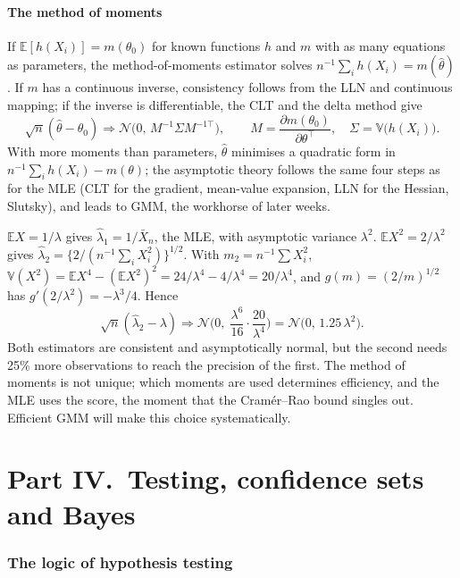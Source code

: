 \documentclass[11pt,a4paper]{article}
\newcommand{\E}{\mathbb{E}}
\newcommand{\V}{\mathbb{V}}
\newcommand{\N}{\mathcal{N}}
\newcommand{\cd}{\Rightarrow}
\newcommand{\Xbar}{\bar X_n}
\begin{document}
\subsection{The method of moments}

If $\E[h(X_i)]=m(\theta_0)$ for known functions $h$ and $m$ with as many equations as parameters, the method-of-moments estimator solves $n^{-1}\sum_ih(X_i)=m(\hat\theta)$. If $m$ has a continuous inverse, consistency follows from the LLN and continuous mapping; if the inverse is differentiable, the CLT and the delta method give
\[
\sqrt n(\hat\theta-\theta_0)\cd\N\big(0,\,M^{-1}\Sigma M^{-1\top}\big),\qquad M=\frac{\partial m(\theta_0)}{\partial\theta^\top},\quad\Sigma=\V\big(h(X_i)\big).
\]
With more moments than parameters, $\hat\theta$ minimises a quadratic form in $n^{-1}\sum_ih(X_i)-m(\theta)$; the asymptotic theory follows the same four steps as for the MLE (CLT for the gradient, mean-value expansion, LLN for the Hessian, Slutsky), and leads to GMM, the workhorse of later weeks.

\begin{example}\label{ex:mom}
$\E X=1/\lambda$ gives $\hat\lambda_1=1/\Xbar$, the MLE, with asymptotic variance $\lambda^2$. $\E X^2=2/\lambda^2$ gives $\hat\lambda_2=\{2/(n^{-1}\sum_iX_i^2)\}^{1/2}$. With $m_2=n^{-1}\sum X_i^2$, $\V(X^2)=\E X^4-(\E X^2)^2=24/\lambda^4-4/\lambda^4=20/\lambda^4$, and $g(m)=(2/m)^{1/2}$ has $g'(2/\lambda^2)=-\lambda^3/4$. Hence
\[
\sqrt n(\hat\lambda_2-\lambda)\cd\N\Big(0,\;\frac{\lambda^6}{16}\cdot\frac{20}{\lambda^4}\Big)=\N\big(0,\,1.25\,\lambda^2\big).
\]
Both estimators are consistent and asymptotically normal, but the second needs 25\% more observations to reach the precision of the first. The method of moments is not unique; which moments are used determines efficiency, and the MLE uses the score, the moment that the Cram\'er--Rao bound singles out. Efficient GMM will make this choice systematically.
\end{example}

\clearpage
\part*{Part IV.\ Testing, confidence sets and Bayes}

\section{The logic of hypothesis testing}\label{sec:testing}
\end{document}
